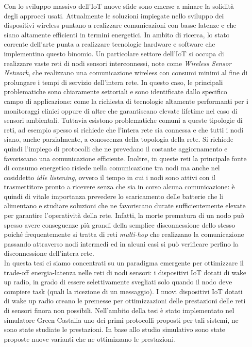 \documentclass[binding=0.6cm,TFA]{sapthesis}
\begin{document}
Con lo sviluppo massivo dell'IoT nuove sfide sono emerse a minare la solidità degli approcci usati. Attualmente le soluzioni impiegate nello sviluppo
dei dispositivi wireless puntano a realizzare comunicazioni con basse latenze e che siano altamente efficienti in termini energetici. In ambito di ricerca,
lo stato corrente dell'arte punta a realizzare tecnologie hardware e software che implementino questo binomio. Un particolare
settore dell'IoT si occupa di realizzare vaste reti di nodi sensori interconnessi, note come \emph{Wireless Sensor Network},
che realizzano una comunicazione wireless con consumi minimi al fine di prolungare i tempi di servizio dell'intera rete. In questo caso,
le principali problematiche sono chiaramente settoriali e sono identificate dallo specifico campo di applicazione: come la richiesta di tecnologie
altamente performanti per i monitoraggi clinici oppure di altre che garantiscano elevate lifetime nel caso di sensori ambientali. Tuttavia esistono
problematiche comuni a queste tipologie di reti, ad esempio spesso si richiede che l'intera rete sia connessa e che tutti i nodi siano,
anche parzialmente, a conoscenza della topologia della rete. Si richiede quindi l'impiego di protocolli che ne prevedano il
costante aggiornamento e favoriscano una comunicazione efficiente. Inoltre, in queste reti la principale fonte di consumo energetico risiede
nella comunicazione tra nodi ma anche nel cosiddetto \emph{idle listening}, ovvero il tempo in cui i nodi sono attivi con il trasmettitore pronto a
ricevere senza che sia in corso alcuna comunicazione: è quindi di vitale importanza prevedere lo scaricamento delle batterie che li alimentano
e studiare soluzioni che ne favoriscano durate sufficientemente elevate per garantire l'operatività della rete. Infatti, la morte prematura di un nodo
può spesso avere conseguenze più grandi della semplice disconnessione dello stesso poiché frequentemente si tratta di reti \emph{multi-hop} che
realizzano la comunicazione passando attraverso nodi intermedi ed in alcuni casi si può verificare perfino la disconnessione dell'intera rete.\\

In questa tesi ci siamo concentrati su un paradigma emergente per ottimizzare il trade-off energia-latenza nelle reti di nodi sensori: i dispositivi IoT
dotati di wake up radio, in grado di essere selettivamente svegliati solo quando il nodo deve compiere task (quali la ricezione di un messaggio). I nuovi
dispositivi IoT dotati di wake up radio creano le premesse per ottimizzazioni delle prestazioni delle reti di sensori finora non possibili. Nell'ambito
della tesi è stato implementato nel simulatore Green Castalia uno dei primi protocolli proposti per tali sistemi, ne sono state studiate le prestazioni.
In base allo studio simulativo sono state proposte nuove varianti che ne ottimizzano le prestazioni.\\
\end{document}
